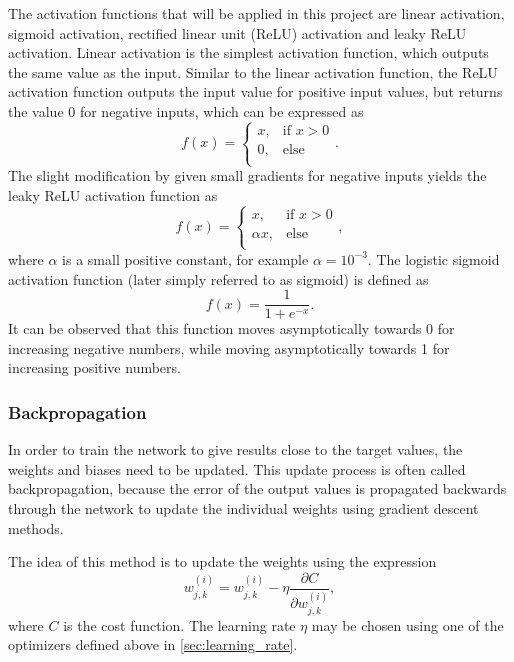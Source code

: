 \documentclass[12pt]{article}
\begin{document}
The activation functions that will be applied in this project are linear activation, sigmoid activation, rectified linear unit (ReLU) activation and leaky ReLU activation. Linear activation is the simplest activation function, which outputs the same value as the input. Similar to the linear activation function, the ReLU activation function outputs the input value for positive input values, but returns the value \num{0} for negative inputs, which can be expressed as
\begin{equation}
    f(x) = 
    \begin{cases}
        x, & \text{if } x > 0 \\
        0, & \text{else} \\
    \end{cases}.
\end{equation}
The slight modification by given small gradients for negative inputs yields the leaky ReLU activation function as
\begin{equation} \label{eq:leaky_relu}
    f(x) = 
    \begin{cases}
        x, & \text{if } x > 0 \\
        \alpha x, & \text{else} \\
    \end{cases},
\end{equation}
where $\alpha$ is a small positive constant, for example $\alpha = 10^{-3}$. The logistic sigmoid activation function (later simply referred to as sigmoid) is defined as 
\begin{equation}\label{eq:sigmoid}
    f(x) = \frac{1}{1+e^{-x}}.
\end{equation}
It can be observed that this function moves asymptotically towards \num{0} for increasing negative numbers, while moving asymptotically towards \num{1} for increasing positive numbers. 


\subsubsection{Backpropagation}
In order to train the network to give results close to the target values, the weights and biases need to be updated. This update process is often called backpropagation, because the error of the output values is propagated backwards through the network to update the individual weights using gradient descent methods.

The idea of this method is to update the weights using the expression
\begin{equation}\label{eq:weight_update}
    w^{(i)}_{j, k} = w^{(i)}_{j, k} - \eta \frac{\partial C}{\partial w^{(i)}_{j, k}},
\end{equation}
where $C$ is the cost function. The learning rate $\eta$ may be chosen using one of the optimizers defined above in \autoref{sec:learning_rate}. 
\end{document}
